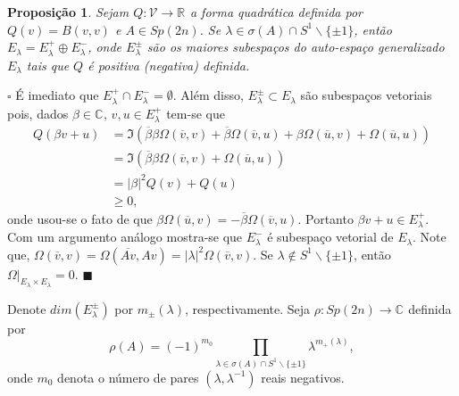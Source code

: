 \documentclass[12pt]{book}
\newtheorem{proposicao}[teorema]{Proposição}
\newenvironment{prova}[1]{$\square$ #1}{\hfill$\blacksquare$}
\newcommand{\autoespaco}[1]{E_{#1}}
\newcommand{\circulo}{S^{1}}
\newcommand{\complementar}[2]{#1 \backslash #2}
\newcommand{\complexificado}[1]{\mathcal{#1}}
\newcommand{\complexo}[1]{\mathbb{C}^{#1}}
\newcommand{\espectrooperador}[1]{\sigma(#1)}
\newcommand{\formaSimpleticaExtendida}[2]{\Omega(#1, #2)}
\newcommand{\gruposimpletico}[1]{Sp(#1)}
\newcommand{\parteImaginaria}[1]{\Im(#1)}
\newcommand{\real}[1]{\mathbb{R}^{#1}}
\newcommand{\reta}{\real{}}
\begin{document}
	\begin{proposicao}\label{proposicao_forma_quadratica_Q}
		Sejam  $Q: \complexificado{V} \to \reta$ a forma quadrática definida por $Q(v) = B(v,v)$ e $A \in \gruposimpletico{2n}$. Se $\lambda\in \espectrooperador{A} \cap \complementar{\circulo}{\{\pm 1 \} }$, então   $\autoespaco{\lambda} = \autoespaco{\lambda}^{+}\oplus \autoespaco{\lambda}^{-}$, onde $\autoespaco{\lambda}^{\pm}$ são os maiores subespaços do auto-espaço generalizado $\autoespaco{\lambda}$ tais que $Q$ é positiva (negativa) definida.
	\end{proposicao}
	\begin{prova}
		É imediato que $\autoespaco{\lambda}^{+} \cap \autoespaco{\lambda}^{-} = \emptyset$. Além disso, $\autoespaco{\lambda}^{\pm} \subset \autoespaco{\lambda}$ são subespaços vetoriais pois, dados $\beta\in \complexo{}$, $v, u\in \autoespaco{\lambda}^{+}$ tem-se que 
		$$
		\begin{aligned}
		Q(\beta v +u) &= \parteImaginaria{\overline{\beta}\beta\formaSimpleticaExtendida{\overline{v}}{v}+ \overline{\beta}\formaSimpleticaExtendida{\overline{v}}{u}+ \beta\formaSimpleticaExtendida{\overline{u}}{v}+ \formaSimpleticaExtendida{\overline{u}}{u}}
		\\
		&=\parteImaginaria{\overline{\beta}\beta\formaSimpleticaExtendida{\overline{v}}{v}+ \formaSimpleticaExtendida{\overline{u}}{u}}
		\\
		&=|\beta|^{2}Q(v)+Q(u)
		\\
		&\geq0,
		\end{aligned}
		$$
		onde usou-se o fato de que $\beta\formaSimpleticaExtendida{\overline{u}}{v}=-\overline{\beta}\formaSimpleticaExtendida{\overline{v}}{u}$. Portanto $\beta v +u \in \autoespaco{\lambda}^{+}$. Com um argumento análogo mostra-se que $\autoespaco{\lambda}^{-}$ é subespaço vetorial de $\autoespaco{\lambda}$. Note que, $\formaSimpleticaExtendida{\overline{v}}{v}=\formaSimpleticaExtendida{\overline{Av}}{Av} =|\lambda|^{2}\formaSimpleticaExtendida{\overline{v}}{v}$. Se $\lambda \notin \complementar{\circulo}{\{\pm 1 \} }$, então $\Omega|_{\autoespaco{\lambda}\times \autoespaco{\lambda}} = 0$.
	\end{prova}
	
	Denote $dim(\autoespaco{\lambda}^{\pm})$ por $m_{\pm}(\lambda)$, respectivamente.  Seja $\rho: \gruposimpletico{2n}\to \complexo{}$ definida por
	$$
	\rho(A) = 	(-1)^{m_{0}} \prod_{\lambda \in \sigma(A)\cap \complementar{\circulo}{\{\pm 1 \}  }}\lambda^{m_{+}(\lambda)},
	$$
	onde $m_{0}$ denota o número de pares $(\lambda, \lambda^{-1})$ reais negativos.
\end{document}
